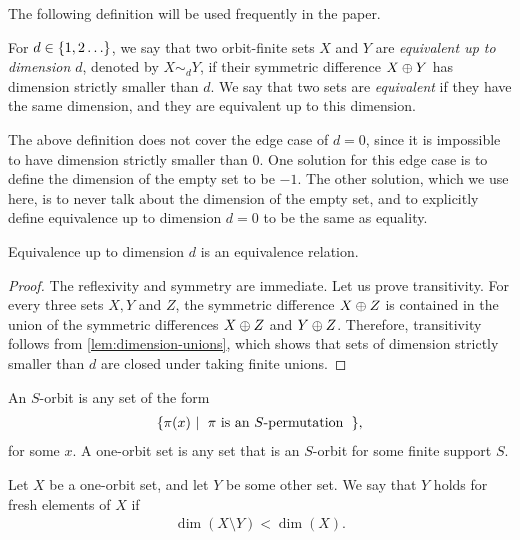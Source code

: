 The following definition  will be used frequently in the paper. 

\begin{definition} For $d \in \{1,2\ldots\}$,  we say that two  orbit-finite sets $X$ and $Y$ are \emph{equivalent up to dimension $d$}, denoted by $X \sim_d Y$,  if their symmetric difference $X \oplus Y$ has dimension strictly smaller than $d$. We say that two sets are \emph{equivalent} if they have the same dimension, and they are equivalent up to this dimension.
\end{definition}

The above definition does not cover the edge case of $d=0$, since it is impossible to have dimension strictly smaller than $0$. One  solution for this edge case is to define the dimension of the empty set to be $-1$. The other solution, which we use here, is to never talk about the dimension of the empty set, and to explicitly define  equivalence up to dimension $d=0$ to be  the same as equality. 


\begin{lemma}
    Equivalence up to dimension $d$ is an equivalence relation.
\end{lemma}
\begin{proof}
    The reflexivity and symmetry are immediate. Let us prove transitivity. For every three sets $X, Y$ and $Z$, the  symmetric difference $X \oplus Z$ is contained in the union of the symmetric differences $X \oplus Z$ and $Y \oplus Z$. Therefore, transitivity follows from \cref{lem:dimension-unions}, which shows that sets of dimension strictly smaller than $d$ are closed under taking finite unions.
\end{proof}



\begin{definition}
    An $S$-orbit is any set of the form 
    \begin{align*}
    \setbuild{\pi(x)}{ $\pi$ is an $S$-permutation},
    \end{align*}
    for some $x$. A one-orbit set is any set that is an $S$-orbit for some finite support $S$. 
\end{definition}


\begin{definition}
    Let $X$ be a one-orbit set, and let $Y$ be some other set. We say that $Y$ holds for fresh elements of $X$ if 
    \begin{align*}
    \dim(X \setminus Y) < \dim(X).
    \end{align*}
\end{definition}

